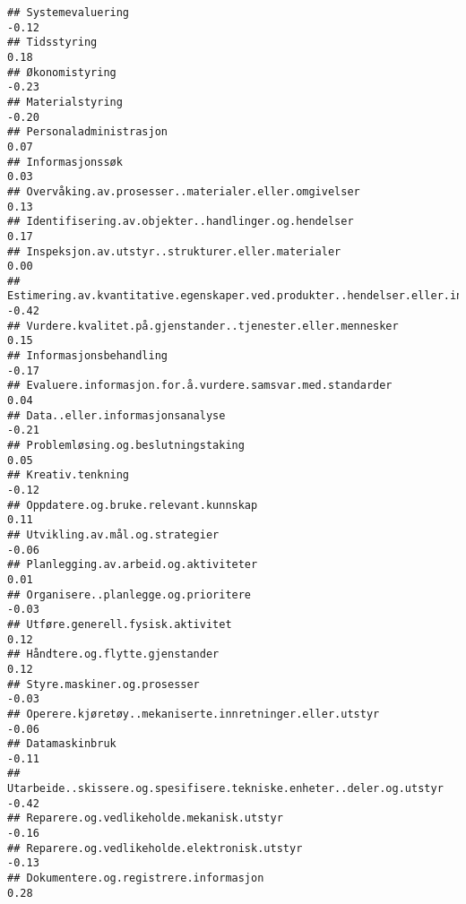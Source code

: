 \documentclass[
]{article}
\begin{document}
\begin{verbatim}
## Systemevaluering                                                                 -0.12
## Tidsstyring                                                                       0.18
## Økonomistyring                                                                   -0.23
## Materialstyring                                                                  -0.20
## Personaladministrasjon                                                            0.07
## Informasjonssøk                                                                   0.03
## Overvåking.av.prosesser..materialer.eller.omgivelser                              0.13
## Identifisering.av.objekter..handlinger.og.hendelser                               0.17
## Inspeksjon.av.utstyr..strukturer.eller.materialer                                 0.00
## Estimering.av.kvantitative.egenskaper.ved.produkter..hendelser.eller.informasjon -0.42
## Vurdere.kvalitet.på.gjenstander..tjenester.eller.mennesker                        0.15
## Informasjonsbehandling                                                           -0.17
## Evaluere.informasjon.for.å.vurdere.samsvar.med.standarder                         0.04
## Data..eller.informasjonsanalyse                                                  -0.21
## Problemløsing.og.beslutningstaking                                                0.05
## Kreativ.tenkning                                                                 -0.12
## Oppdatere.og.bruke.relevant.kunnskap                                              0.11
## Utvikling.av.mål.og.strategier                                                   -0.06
## Planlegging.av.arbeid.og.aktiviteter                                              0.01
## Organisere..planlegge.og.prioritere                                              -0.03
## Utføre.generell.fysisk.aktivitet                                                  0.12
## Håndtere.og.flytte.gjenstander                                                    0.12
## Styre.maskiner.og.prosesser                                                      -0.03
## Operere.kjøretøy..mekaniserte.innretninger.eller.utstyr                          -0.06
## Datamaskinbruk                                                                   -0.11
## Utarbeide..skissere.og.spesifisere.tekniske.enheter..deler.og.utstyr             -0.42
## Reparere.og.vedlikeholde.mekanisk.utstyr                                         -0.16
## Reparere.og.vedlikeholde.elektronisk.utstyr                                      -0.13
## Dokumentere.og.registrere.informasjon                                             0.28

\end{verbatim}
\end{document}
